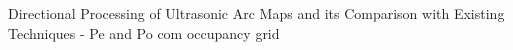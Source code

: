 Directional Processing of
Ultrasonic Arc Maps and
its Comparison with
Existing Techniques - Pe and Po com occupancy grid